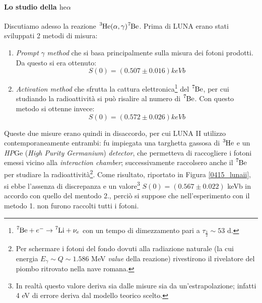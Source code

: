 \paragraph{Lo studio della $\mbox{he}\alpha$} Discutiamo adesso la reazione $\ce{^3He(\alpha,\gamma)\ce{^7Be}}$. Prima di LUNA erano stati sviluppati 2 metodi di misura:
\begin{enumerate}
	\item \textit{Prompt} $\gamma$ \textit{method} che si basa principalmente sulla misura dei fotoni prodotti. Da questo si era ottenuto:
	$$S(0) = (0.507 \pm 0.016) \unit{keVb}$$
	\item \textit{Activation method} che sfrutta la cattura elettronica\footnote{$\ce{^7Be}+e^- \to \ce{^7Li} + \nu_e$ con un tempo di dimezzamento pari a $\tau_\frac{1}{2} \sim 53$ d.} del $\ce{^7Be}$, per cui studiando la radioattività si può risalire al numero di $\ce{^7Be}$. Con questo metodo si ottenne invece:
	$$S(0) = (0.572 \pm 0.026) \unit{keVb}$$
\end{enumerate} 
Queste due misure erano quindi in disaccordo, per cui LUNA II utilizzo contemporaneamente entrambi: fu impiegata una targhetta gassosa di $\ce{^3He}$ e un \textit{HP}Ge (\textit{High Purity Germanium}) \textit{detector}, che permetteva di raccogliere i fotoni emessi vicino alla \textit{interaction chamber}; successivamente raccolsero anche il $\ce{^7Be}$ per studiare la radioattività\footnote{Per schermare i fotoni del fondo dovuti alla radiazione naturale (la cui energia $E_\gamma\sim Q\sim 1.586$ MeV \textit{value} della reazione) rivestirono il rivelatore del piombo ritrovato nella nave romana.}. Come risultato, riportato in Figura \ref{0415_lunaii}, si ebbe l'assenza di discrepanza e un valore\footnote{In realtà questo valore deriva sia dalle misure sia da un'estrapolazione; infatti 4 eV di errore deriva dal modello teorico scelto.} $S(0) = (0.567\pm 0.022)$ keVb in accordo con quello del mentodo 2., perciò si suppose che nell'esperimento con il metodo 1. non furono raccolti tutti i fotoni.

